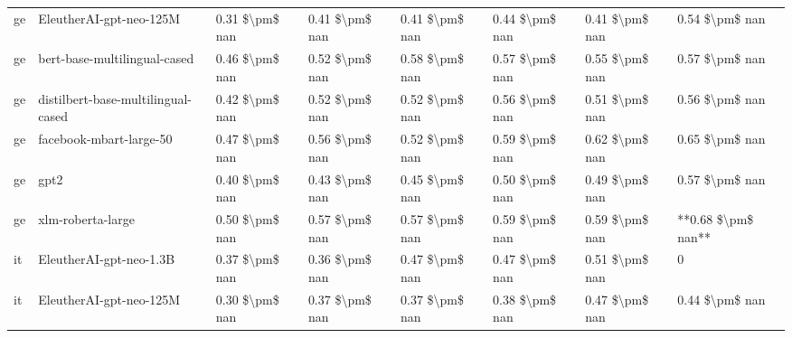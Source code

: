 \begin{tabular}{llllllll}
      ge &            EleutherAI-gpt-neo-125M & 0.31 \$\textbackslash pm\$ nan &            0.41 \$\textbackslash pm\$ nan &        0.41 \$\textbackslash pm\$ nan &         0.44 \$\textbackslash pm\$ nan &                          0.41 \$\textbackslash pm\$ nan &     0.54 \$\textbackslash pm\$ nan \\
      ge &       bert-base-multilingual-cased & 0.46 \$\textbackslash pm\$ nan &            0.52 \$\textbackslash pm\$ nan &        0.58 \$\textbackslash pm\$ nan &         0.57 \$\textbackslash pm\$ nan &                          0.55 \$\textbackslash pm\$ nan &     0.57 \$\textbackslash pm\$ nan \\
      ge & distilbert-base-multilingual-cased & 0.42 \$\textbackslash pm\$ nan &            0.52 \$\textbackslash pm\$ nan &        0.52 \$\textbackslash pm\$ nan &         0.56 \$\textbackslash pm\$ nan &                          0.51 \$\textbackslash pm\$ nan &     0.56 \$\textbackslash pm\$ nan \\
      ge &            facebook-mbart-large-50 & 0.47 \$\textbackslash pm\$ nan &            0.56 \$\textbackslash pm\$ nan &        0.52 \$\textbackslash pm\$ nan &         0.59 \$\textbackslash pm\$ nan &                          0.62 \$\textbackslash pm\$ nan &     0.65 \$\textbackslash pm\$ nan \\
      ge &                               gpt2 & 0.40 \$\textbackslash pm\$ nan &            0.43 \$\textbackslash pm\$ nan &        0.45 \$\textbackslash pm\$ nan &         0.50 \$\textbackslash pm\$ nan &                          0.49 \$\textbackslash pm\$ nan &     0.57 \$\textbackslash pm\$ nan \\
      ge &                  xlm-roberta-large & 0.50 \$\textbackslash pm\$ nan &            0.57 \$\textbackslash pm\$ nan &        0.57 \$\textbackslash pm\$ nan &         0.59 \$\textbackslash pm\$ nan &                          0.59 \$\textbackslash pm\$ nan & **0.68 \$\textbackslash pm\$ nan** \\
      it &            EleutherAI-gpt-neo-1.3B & 0.37 \$\textbackslash pm\$ nan &            0.36 \$\textbackslash pm\$ nan &        0.47 \$\textbackslash pm\$ nan &         0.47 \$\textbackslash pm\$ nan &                          0.51 \$\textbackslash pm\$ nan &                  0 \\
      it &            EleutherAI-gpt-neo-125M & 0.30 \$\textbackslash pm\$ nan &            0.37 \$\textbackslash pm\$ nan &        0.37 \$\textbackslash pm\$ nan &         0.38 \$\textbackslash pm\$ nan &                          0.47 \$\textbackslash pm\$ nan &     0.44 \$\textbackslash pm\$ nan \\

\end{tabular}
